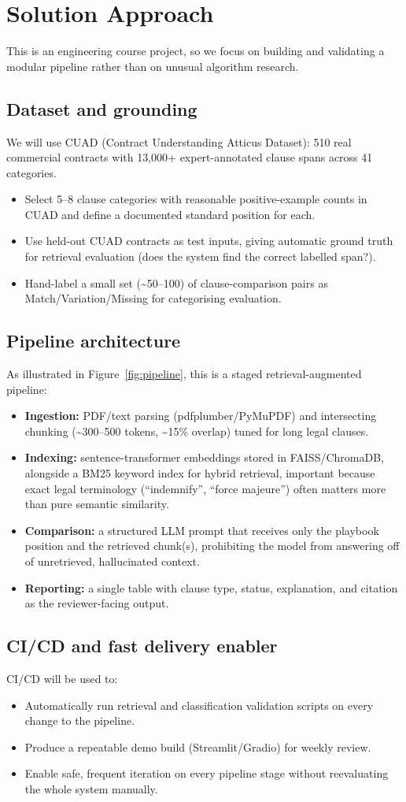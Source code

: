 \documentclass[11pt]{article}
\newcommand{\secx}[1]{\section{#1}}
\newcommand{\subsecx}[1]{\subsection{#1}}
\begin{document}
\secx{Solution Approach}
This is an engineering course project, so we focus on building and validating a
modular pipeline rather than on unusual algorithm research.

\subsecx{Dataset and grounding}
We will use CUAD (Contract Understanding Atticus Dataset): 510 real commercial contracts
with 13,000+ expert-annotated clause spans across 41 categories.
\begin{itemize}
  \item Select 5--8 clause categories with reasonable positive-example counts in
  CUAD and define a documented standard position for each.
  \item Use held-out CUAD contracts as test inputs, giving automatic ground truth for
  retrieval evaluation (does the system find the correct labelled span?).
  \item Hand-label a small set (\textasciitilde50--100) of clause-comparison pairs as
  Match/Variation/Missing for categorising evaluation.
\end{itemize}

\subsecx{Pipeline architecture}
As illustrated in Figure~\ref{fig:pipeline}, this is a staged retrieval-augmented pipeline:
\begin{itemize}
  \item \textbf{Ingestion:} PDF/text parsing (pdfplumber/PyMuPDF) and intersecting
  chunking (\textasciitilde300--500 tokens, \textasciitilde15\% overlap) tuned
  for long legal clauses.
  \item \textbf{Indexing:} sentence-transformer embeddings stored in FAISS/ChromaDB,
  alongside a BM25 keyword index for hybrid retrieval,  important because
  exact legal terminology (``indemnify'', ``force majeure'') often matters
  more than pure semantic similarity.
  \item \textbf{Comparison:} a structured LLM prompt that receives only the playbook
  position and the retrieved chunk(s), prohibiting the model from answering off
  of unretrieved, hallucinated context.
  \item \textbf{Reporting:} a single table with  clause type, status, explanation, and
  citation  as the reviewer-facing output.
\end{itemize}

\subsecx{CI/CD and fast delivery enabler}
CI/CD will be used to:
\begin{itemize}
  \item Automatically run retrieval and classification validation scripts on every
  change to the pipeline.
  \item Produce a repeatable demo build (Streamlit/Gradio) for weekly review.
  \item Enable safe, frequent iteration on every pipeline stage without
  reevaluating the whole system manually.
\end{itemize}
\end{document}

